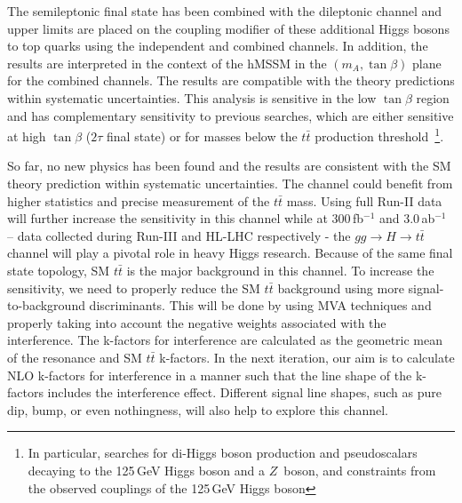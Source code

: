 The semileptonic final state has been combined with the dileptonic channel and upper limits are placed on the coupling modifier of these additional Higgs bosons to top quarks using the independent and combined channels. In addition, the results are interpreted in the context of the hMSSM in the $(m_A, \tan\beta)$ plane for the combined channels. The results are compatible with the theory predictions within systematic uncertainties. This analysis is sensitive in the low $\tan\beta$ region and has complementary sensitivity to previous searches, which are either sensitive at high $\tan\beta$ ($2\tau$ final state) or for masses below the $t\bar t$ production threshold~\footnote{In particular, searches for di-Higgs boson production and pseudoscalars decaying to the 125\,GeV Higgs boson and a $Z$~boson, and constraints from the observed couplings of the 125\,GeV Higgs boson}.

So far, no new physics has been found and the results are consistent with the SM theory prediction within systematic uncertainties. The channel could benefit from higher statistics and precise measurement of the $t\bar t$ mass. Using full Run-II data will further increase the sensitivity in this channel while at 300\,fb$^{-1}$ and 3.0\,ab$^{-1}$ – data collected during Run-III and HL-LHC respectively - the $gg\rightarrow H\rightarrow t\bar t$ channel will play a pivotal role in heavy Higgs research. Because of the same final state topology, SM $t\bar t$ is the major background in this channel. To increase the sensitivity, we need to properly reduce the SM $t\bar t$ background using more signal-to-background discriminants. This will be done by using MVA techniques and properly taking into account the negative weights associated with the interference. The k-factors for interference are calculated as the geometric mean of the resonance and SM $t\bar t$ k-factors. In the next iteration, our aim is to calculate NLO k-factors for interference in a manner such that the line shape of the k-factors includes the interference effect. Different signal line shapes, such as pure dip, bump, or even nothingness, will also help to explore this channel.  



\clearpage{\pagestyle{empty}\cleardoublepage}

\renewcommand*{\thesection}{\thechapter.\arabic{section}}       %


